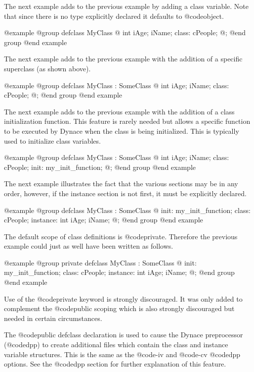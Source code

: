 The next example adds to the previous example by adding a class variable.
Note that since there is no type explicitly declared it defaults to
@code{object}.

@example
@group
defclass   MyClass  @{
        int     iAge;
        iName;
 class:
        cPeople;
@};
@end group
@end example


The next example adds to the previous example with the addition of
a specific superclass (as shown above).

@example
@group
defclass   MyClass  :  SomeClass  @{
        int     iAge;
        iName;
 class:
        cPeople;
@};
@end group
@end example


The next example adds to the previous example with the addition of
a class initialization function.  This feature is rarely needed but allows
a specific function to be executed by Dynace when the class is being
initialized.  This is typically used to initialize class variables.

@example
@group
defclass   MyClass  :  SomeClass  @{
        int     iAge;
        iName;
 class:
        cPeople;
 init:  my_init_function;
@};
@end group
@end example


The next example illustrates the fact that the various sections
may be in any order, however, if the instance section is not first, it
must be explicitly declared.

@example
@group
defclass   MyClass  :  SomeClass  @{
 init:  my_init_function;
 class:
        cPeople;
 instance:
        int     iAge;
        iName;
@};
@end group
@end example

The default scope of class definitions is @code{private}.  Therefore
the previous example could just as well have been written as follows.

@example
@group
private  defclass   MyClass  :  SomeClass  @{
 init:  my_init_function;
 class:
        cPeople;
 instance:
        int     iAge;
        iName;
@};
@end group
@end example

Use of the @code{private} keyword is strongly discouraged.  It was only
added to complement the @code{public} scoping which is also strongly
discouraged but needed in certain circumstances.

The @code{public defclass} declaration is used to cause the Dynace
preprocessor (@code{dpp}) to create additional files which contain the
class and instance variable structures.  This is the same as the
@code{-iv} and @code{-cv} @code{dpp} options.  See the @code{dpp}
section for further explanation of this feature.



